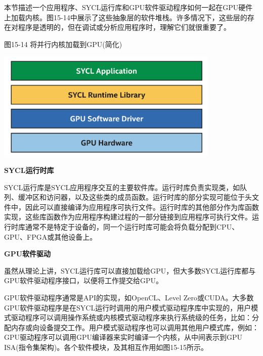 本节描述一个应用程序、SYCL运行库和GPU软件驱动程序如何一起在GPU硬件上加载内核。图15-14中展示了这些抽象层的软件堆栈。许多情况下，这些层的存在对程序是透明的，但在调试或分析应用程序时，理解它们就很重要了。\par

\hspace*{\fill} \par %
图15-14 将并行内核加载到GPU(简化)
\begin{center}
	\includegraphics[width=0.8\textwidth]{content/chapter-15/images/10}
\end{center}

\hspace*{\fill} \par %
\textbf{SYCL运行时库}

SYCL运行库是SYCL应用程序交互的主要软件库。运行时库负责实现类，如队列、缓冲区和访问器，以及这些类的成员函数。运行时库的部分实现可能位于头文件中，因此可以直接编译为应用程序可执行文件。运行时库的其他部分作为库函数实现，这些库函数作为应用程序构建过程的一部分链接到应用程序可执行文件。运行时库通常不是特定于设备的，同一个运行时库可能会将负载分配到CPU、GPU、FPGA或其他设备上。\par

\hspace*{\fill} \par %
\textbf{GPU软件驱动}

虽然从理论上讲，SYCL运行库可以直接加载给GPU，但大多数SYCL运行库都与GPU软件驱动程序接口，以便将工作提交给GPU。\par

GPU软件驱动程序通常是API的实现，如OpenCL、Level Zero或CUDA。大多数GPU软件驱动程序是在SYCL运行时调用的用户模式驱动程序库中实现的，用户模式驱动程序可以调用操作系统或内核模式驱动程序来执行系统级的任务，比如：分配内存或向设备提交工作。用户模式驱动程序也可以调用其他用户模式库，例如：GPU驱动程序可以调用GPU编译器来实时编译一个内核，从中间表示到GPU ISA(指令集架构)。各个软件模块，及其相互作用如图15-15所示。\par

